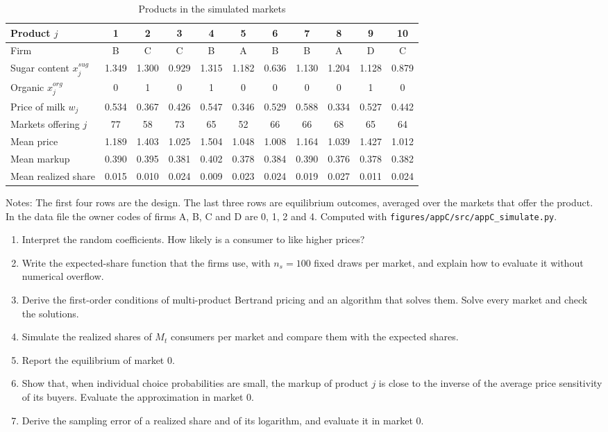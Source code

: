 \begin{table}[htbp]
\centering
\caption{Products in the simulated markets}
\label{tab:C-products}
\footnotesize
\begin{tabular}{@{}lcccccccccc@{}}
\toprule
Product $j$ & 1 & 2 & 3 & 4 & 5 & 6 & 7 & 8 & 9 & 10 \\
\midrule
Firm & B & C & C & B & A & B & B & A & D & C \\
Sugar content $x^{sug}_j$ & 1.349 & 1.300 & 0.929 & 1.315 & 1.182 & 0.636 & 1.130 & 1.204 & 1.128 & 0.879 \\
Organic $x^{org}_j$ & 0 & 1 & 0 & 1 & 0 & 0 & 0 & 0 & 1 & 0 \\
Price of milk $w_j$ & 0.534 & 0.367 & 0.426 & 0.547 & 0.346 & 0.529 & 0.588 & 0.334 & 0.527 & 0.442 \\
\midrule
Markets offering $j$ & 77 & 58 & 73 & 65 & 52 & 66 & 66 & 68 & 65 & 64 \\
Mean price & 1.189 & 1.403 & 1.025 & 1.504 & 1.048 & 1.008 & 1.164 & 1.039 & 1.427 & 1.012 \\
Mean markup & 0.390 & 0.395 & 0.381 & 0.402 & 0.378 & 0.384 & 0.390 & 0.376 & 0.378 & 0.382 \\
Mean realized share & 0.015 & 0.010 & 0.024 & 0.009 & 0.023 & 0.024 & 0.019 & 0.027 & 0.011 & 0.024 \\
\bottomrule
\end{tabular}

\vspace{3pt}
\begin{minipage}{0.97\textwidth}
\footnotesize Notes: The first four rows are the design. The last three rows are equilibrium outcomes, averaged over
the markets that offer the product. In the data file the owner codes of firms A, B, C and D are 0, 1, 2 and 4.
Computed with \texttt{figures/appC/src/appC\_simulate.py}.
\end{minipage}
\end{table}

\begin{enumerate}[label=(\alph*)]
  \item Interpret the random coefficients. How likely is a consumer to like higher prices?
  \item Write the expected-share function that the firms use, with $n_s = 100$ fixed draws per market, and explain how
  to evaluate it without numerical overflow.
  \item Derive the first-order conditions of multi-product Bertrand pricing and an algorithm that solves them. Solve
  every market and check the solutions.
  \item Simulate the realized shares of $M_t$ consumers per market and compare them with the expected shares.
  \item Report the equilibrium of market 0.
  \item Show that, when individual choice probabilities are small, the markup of product $j$ is close to the inverse
  of the average price sensitivity of its buyers. Evaluate the approximation in market 0.
  \item Derive the sampling error of a realized share and of its logarithm, and evaluate it in market 0.
\end{enumerate}

